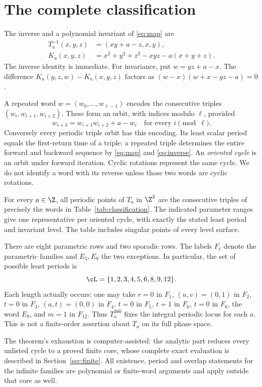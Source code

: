 \section{The complete classification}
\label{sec:classification}

The inverse and a polynomial invariant of \eqref{eq:map} are
\begin{align}
 T_a^{-1}(x,y,z)&=(xy+a-z,x,y), \label{eq:inverse}\\
 K_a(x,y,z)&=x^2+y^2+z^2-xyz-a(x+y+z).
 \label{eq:invariant}
\end{align}
The inverse identity is immediate. For invariance, put $w=yz+a-x$.
The difference $K_a(y,z,w)-K_a(x,y,z)$ factors as
$(w-x)(w+x-yz-a)=0$.

A repeated word $w=(w_0,\ldots,w_{\ell-1})$ encodes the
consecutive triples $(w_i,w_{i+1},w_{i+2})$.
These form an orbit, with indices modulo $\ell$, provided
\begin{equation}
 w_{i+3}=w_{i+1}w_{i+2}+a-w_i
 \quad\text{for every }i\pmod\ell.
 \label{eq:scalar}
\end{equation}
Conversely every periodic triple orbit has this encoding. Its
least scalar period equals the first-return time of a triple:
a repeated triple determines the entire forward and backward
sequence by \eqref{eq:map} and \eqref{eq:inverse}.
An \emph{oriented cycle} is an orbit under forward iteration.
Cyclic rotations represent the same cycle. We do not identify a
word with its reverse unless those two words are cyclic rotations.

\begin{theorem}
\label{thm:classification}
For every $a\in\Z$, all periodic points of $T_a$ in $\Z^3$ are
the consecutive triples of precisely the words in
Table~\ref{tab:classification}. The indicated parameter ranges
give one representative per oriented cycle, with exactly the
stated least period and invariant level. The table includes
singular points of every level surface.
\end{theorem}



There are eight parametric rows and two sporadic rows. The labels
$F_\ell$ denote the parametric families and $E_5,E_9$ the two
exceptions. In particular, the set of possible least periods is
\begin{equation}
 \cL=\{1,2,3,4,5,6,8,9,12\}.
 \label{eq:periodset}
\end{equation}
Each length actually occurs: one may take $r=0$ in $F_1$,
$(u,v)=(0,1)$ in $F_2$, $t=0$ in $F_3$,
$(a,t)=(0,0)$ in $F_4$, $t=0$ in $F_5$,
$t=1$ in $F_6$, $t=0$ in $F_8$, the word $E_9$,
and $m=1$ in $F_{12}$.
Thus $T_a^{360}$ fixes the integral periodic locus for each $a$.
This is not a finite-order assertion about $T_a$ on its full phase
space.

The theorem's exhaustion is computer-assisted: the analytic part
reduces every unlisted cycle to a proved finite core, whose complete
exact evaluation is described in Section~\ref{sec:finite}.
All existence, period and overlap statements for the infinite
families are polynomial or finite-word arguments and apply outside
that core as well.
